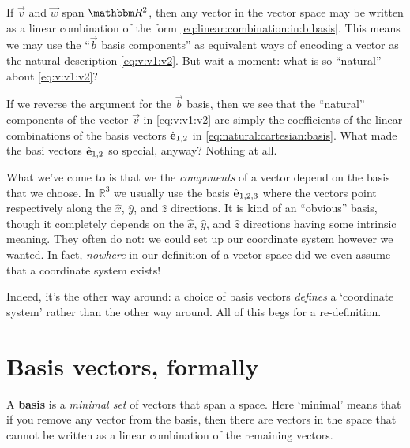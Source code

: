 \documentclass[12pt, oneside]{report}    %
\let\oldsection\section
\def\section{%
  \setcounter{sidenote}{1}%
  \oldsection
}
\begin{document}
If $\vec{v}$ and $\vec{w}$ span $\RR ^2$, then any vector in the vector space may be written as a linear combination of the form \eqref{eq:linear:combination:in:b:basis}. This means we may use the ``$\vec{b}$ basis components'' as equivalent ways of encoding a vector as the natural description \eqref{eq:v:v1:v2}. But wait a moment: what is so ``natural'' about \eqref{eq:v:v1:v2}? 

If we reverse the argument for the $\vec{b}$ basis, then we see that the ``natural'' components of the vector $\vec{v}$ in \eqref{eq:v:v1:v2} are simply the coefficients of the linear combinations of the basis vectors ${\hat{\mathbf{e}}}_{1,2}$ in \eqref{eq:natural:cartesian:basis}. What made the basi vectors ${\hat{\mathbf{e}}}_{1,2}$ so special, anyway? Nothing at all. 

What we've come to is that we the \emph{components} of a vector depend on the basis that we choose. In $\mathbb{R}^3$ we usually use the basis ${\hat{\mathbf{e}}}_{1,2,3}$ where the vectors point respectively along the $\hat{x}$, $\hat{y}$, and $\hat{z}$ directions. It is kind of an ``obvious'' basis, though it completely depends on the $\hat{x}$, $\hat{y}$, and $\hat{z}$ directions having some intrinsic meaning. They often do not: we could set up our coordinate system however we wanted. In fact, \emph{nowhere} in our definition of a vector space did we even assume that a coordinate system exists!

Indeed, it's the other way around: a choice of basis vectors \emph{defines} a `coordinate system' rather than the other way around. All of this begs for a re-definition.





\section{Basis vectors, formally}

A \textbf{basis} is a \emph{minimal set} of vectors that span a space. Here `minimal' means that if you remove any vector from the basis, then there are vectors in the space that cannot be written as a linear combination of the remaining vectors.
\end{document}
